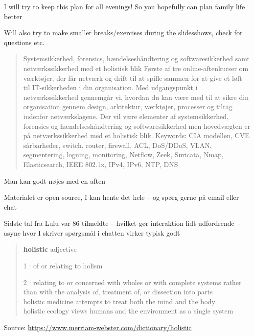 \documentclass[Screen16to9,17pt]{foils}
\begin{document}
\centerline{I will try to keep this plan for all evenings! So you hopefully can plan family life better}

Will also try to make smaller breaks/exercises during the slidesshows, check for questions etc.



\begin{quote}
Systemsikkerhed, forensics, hændelseshåndtering og softwaresikkerhed samt netværkssikkerhed med et holistisk blik
Første af tre online-aftenkurser om værktøjer, der får netværk og drift til at spille sammen for at give et løft til IT-sikkerheden i din organisation. Med udgangspunkt i netværkssikkerhed gennemgår vi, hvordan du kan være med til at sikre din organisation gennem design, arkitektur, værktøjer, processer og tiltag indenfor netværkslagene. Der vil være elementer af systemsikkerhed, forensics og hændelseshåndtering og softwaresikkerhed men hovedvægten er på netværkssikkerhed med et holistisk blik.
\vskip 5mm
Keywords: CIA modellen, CVE sårbarheder, switch, router, firewall, ACL, DoS/DDoS, VLAN, segmentering, logning, monitoring, Netflow, Zeek, Suricata, Nmap, Elasticsearch, IEEE 802.1x, IPv4, IPv6, NTP, DNS
\end{quote}

\begin{list2}
\item Man kan godt nøjes med en aften
\item Materialet er open source, I kan hente det hele -- og spørg gerne på email eller chat
\item Sidste tal fra Lulu var 86 tilmeldte -- hvilket gør interaktion lidt udfordrende -- async hvor I skriver spørgsmål i chatten virker typisk godt
\end{list2}



\begin{quote}
{\bf\Large holistic} adjective

\begin{list2}
\item[1]: of or relating to holism
\item[2] : relating to or concerned with wholes or with complete systems rather than with the analysis of, treatment of, or dissection into parts\\
holistic medicine attempts to treat both the mind and the body\\
holistic ecology views humans and the environment as a single system
\end{list2}
\end{quote}
Source: \url{https://www.merriam-webster.com/dictionary/holistic}
\end{document}

